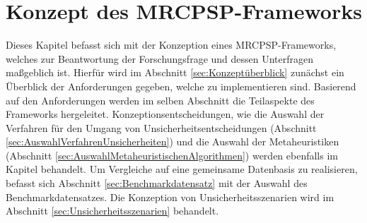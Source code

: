 \chapter{Konzept des MRCPSP-Frameworks} \label{ch:Konzept}

Dieses Kapitel befasst sich mit der Konzeption eines MRCPSP-Frameworks, welches zur Beantwortung der Forschungsfrage und dessen Unterfragen maßgeblich ist. Hierfür wird im Abschnitt \ref{sec:Konzeptüberblick} zunächst ein Überblick der Anforderungen gegeben, welche zu implementieren sind. Basierend auf den Anforderungen werden im selben Abschnitt die Teilaspekte des Frameworks hergeleitet. Konzeptionsentscheidungen, wie die Auswahl der Verfahren für den Umgang von Unsicherheitsentscheidungen (Abschnitt \ref{sec:AuswahlVerfahrenUnsicherheiten}) und die Auswahl der Metaheuristiken (Abschnitt \ref{sec:AuswahlMetaheuristischenAlgorithmen}) werden ebenfalls im Kapitel behandelt. Um Vergleiche auf eine gemeinsame Datenbasis zu realisieren, befasst sich Abschnitt \ref{sec:Benchmarkdatensatz} mit der Auswahl des Benchmarkdatensatzes. Die Konzeption von Unsicherheitsszenarien wird im Abschnitt \ref{sec:Unsicherheitsszenarien} behandelt. 

